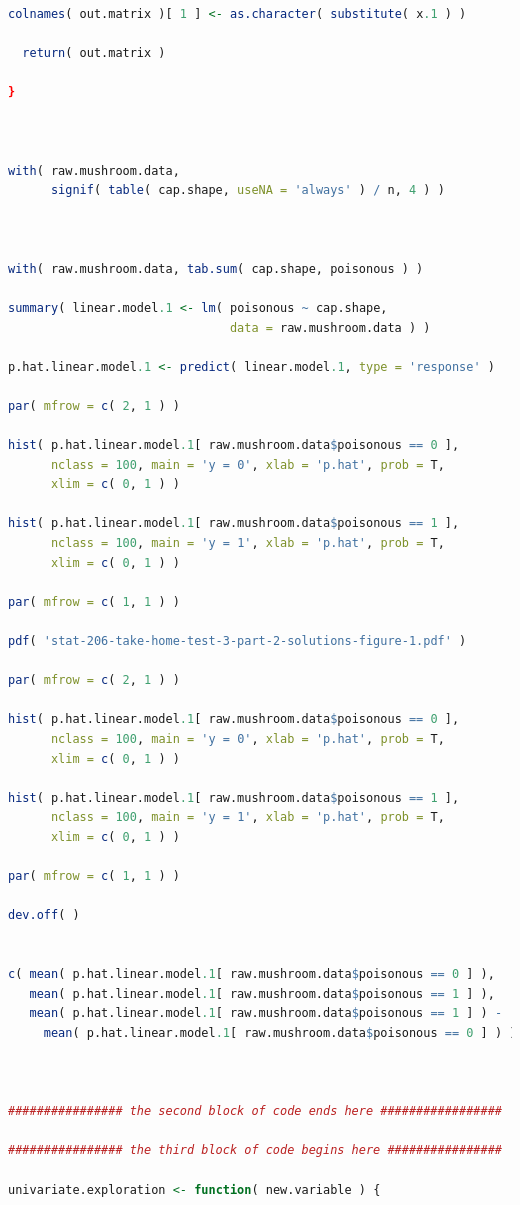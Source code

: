 \documentclass[12pt]{article}
\begin{document}
\begin{lstlisting}[language = R]
  colnames( out.matrix )[ 1 ] <- as.character( substitute( x.1 ) )
  
  return( out.matrix )
  
}



with( raw.mushroom.data, 
      signif( table( cap.shape, useNA = 'always' ) / n, 4 ) )



with( raw.mushroom.data, tab.sum( cap.shape, poisonous ) )

summary( linear.model.1 <- lm( poisonous ~ cap.shape, 
                               data = raw.mushroom.data ) )

p.hat.linear.model.1 <- predict( linear.model.1, type = 'response' )

par( mfrow = c( 2, 1 ) )

hist( p.hat.linear.model.1[ raw.mushroom.data$poisonous == 0 ],
      nclass = 100, main = 'y = 0', xlab = 'p.hat', prob = T,
      xlim = c( 0, 1 ) )

hist( p.hat.linear.model.1[ raw.mushroom.data$poisonous == 1 ],
      nclass = 100, main = 'y = 1', xlab = 'p.hat', prob = T,
      xlim = c( 0, 1 ) )

par( mfrow = c( 1, 1 ) )

pdf( 'stat-206-take-home-test-3-part-2-solutions-figure-1.pdf' )

par( mfrow = c( 2, 1 ) )

hist( p.hat.linear.model.1[ raw.mushroom.data$poisonous == 0 ],
      nclass = 100, main = 'y = 0', xlab = 'p.hat', prob = T,
      xlim = c( 0, 1 ) )

hist( p.hat.linear.model.1[ raw.mushroom.data$poisonous == 1 ],
      nclass = 100, main = 'y = 1', xlab = 'p.hat', prob = T,
      xlim = c( 0, 1 ) )

par( mfrow = c( 1, 1 ) )

dev.off( )


c( mean( p.hat.linear.model.1[ raw.mushroom.data$poisonous == 0 ] ),
   mean( p.hat.linear.model.1[ raw.mushroom.data$poisonous == 1 ] ),
   mean( p.hat.linear.model.1[ raw.mushroom.data$poisonous == 1 ] ) -
     mean( p.hat.linear.model.1[ raw.mushroom.data$poisonous == 0 ] ) )



################ the second block of code ends here #################

################ the third block of code begins here ################

univariate.exploration <- function( new.variable ) {
  

\end{lstlisting}
\end{document}
